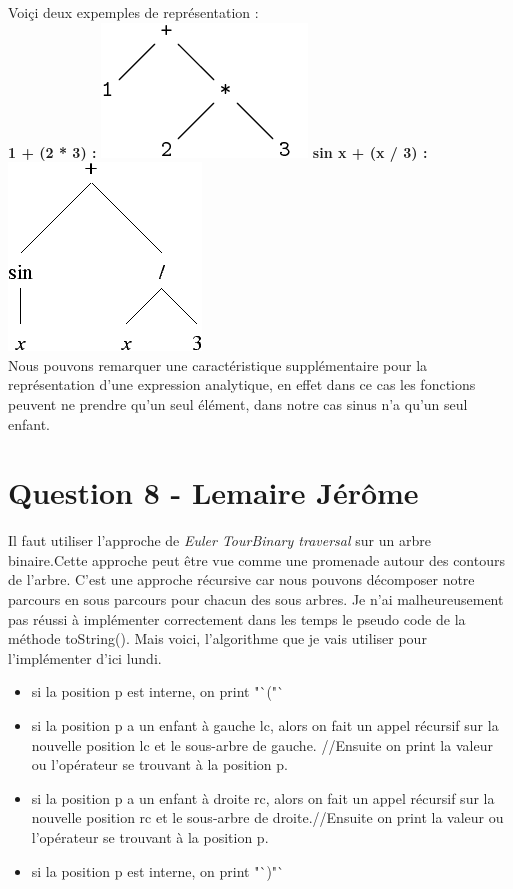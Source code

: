 \documentclass[10pt,a4paper]{article}
\begin{document}
Voiçi deux expemples de représentation :\\

\textbf{1 + (2 * 3) :} \includegraphics[scale=1]{arithmetique.png}
\textbf{sin x + (x / 3) :} \includegraphics[scale=0.5]{analytique.png}\\

Nous pouvons remarquer une caractéristique supplémentaire pour la représentation d'une expression analytique, en effet dans ce cas les fonctions peuvent ne prendre qu'un seul élément, dans notre cas sinus n'a qu'un seul enfant.

\section*{Question 8 - Lemaire Jérôme}
Il faut utiliser l'approche de \textit{Euler TourBinary traversal} sur un arbre binaire.Cette approche peut être vue comme une promenade autour des contours de l'arbre. C'est une approche récursive car nous pouvons décomposer notre parcours en sous parcours pour chacun des sous arbres. Je n'ai malheureusement pas réussi à implémenter correctement dans les temps le pseudo code de la méthode toString(). Mais voici, l'algorithme que je vais utiliser pour l'implémenter d'ici lundi.

\begin{itemize}
	\item si la position p est interne, on print "`("`
	\item si la position p a un enfant à gauche lc, alors on fait un appel récursif sur la nouvelle position lc et le sous-arbre de gauche. //Ensuite on print la valeur ou l'opérateur se trouvant à la position p.
	\item si la position p a un enfant à droite rc, alors on fait un appel récursif sur la nouvelle position rc et le sous-arbre de droite.//Ensuite on print la valeur ou l'opérateur se trouvant à la position p.
	\item si la position p est interne, on print "`)"`
\end{itemize}
\end{document}
